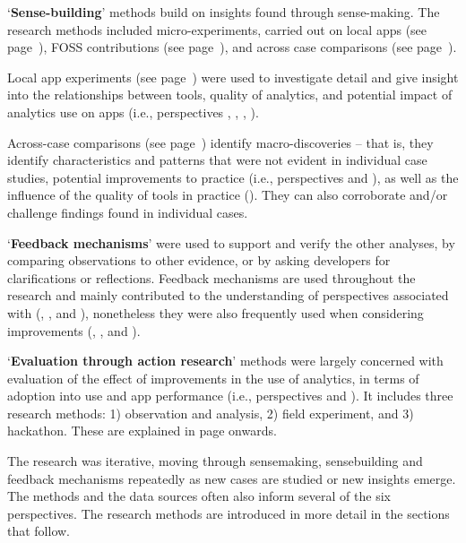 `\textbf{Sense-building}' methods build on insights found through sense-making. The research methods included micro-experiments, carried out on local apps (see page~\pageref{local-app-experiments-research-method}), FOSS contributions (see page~\pageref{foss-contributions-research-methods}), and across case comparisons (see page~\pageref{across-case-comparisons-research-method}).

Local app experiments (see page~\pageref{local-app-experiments-research-method}) were used to investigate detail and give insight into the relationships between tools, quality of analytics, and potential impact of analytics use on apps (i.e., perspectives \uartefacts, \utools, \iartefacts, \itools).

Across-case comparisons (see page~\pageref{across-case-comparisons-research-method}) identify macro-discoveries -- that is, they identify characteristics and patterns that were not evident in individual case studies, potential improvements to practice (i.e., perspectives \uuse and \iuse), as well as the influence of the quality of tools in practice (\itools). They can also corroborate and/or challenge findings found in individual cases.


`\textbf{Feedback mechanisms}' were used to support and verify the other analyses, by comparing observations to other evidence, or by asking developers for clarifications or reflections. Feedback mechanisms are used throughout the research and mainly contributed to the understanding of perspectives associated with (\uuse, \uartefacts, and \utools), nonetheless they were also frequently used when considering improvements (\iuse, \iartefacts, and \itools). 

`\textbf{Evaluation through action research}' methods were largely concerned with evaluation of the effect of improvements in the use of analytics, in terms of adoption into use and app performance (i.e., perspectives \iuse and \iartefacts). It includes three research methods: 1) observation and analysis, 2) field experiment, and 3) hackathon. These are explained in page \pageref{section-evaluation-through-action-research-method} onwards. 

The research was iterative, moving through sensemaking, sensebuilding and feedback mechanisms repeatedly as new cases are studied or new insights emerge.  The methods and the data sources often also inform several of the six perspectives.  The research methods are introduced in more detail in the sections that follow.

